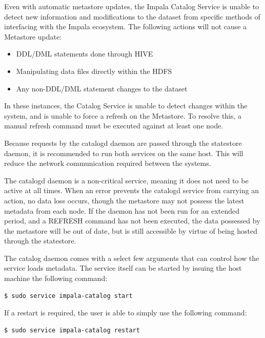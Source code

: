 \documentclass[onecolumn, draftclsnofoot,10pt, compsoc]{IEEEtran}
\begin{document}
Even with automatic metastore updates, the Impala Catalog Service is unable to detect new information and modifications to the dataset from specific methods of interfacing with the Impala ecosystem.
The following actions will not cause a Metastore update:

\begin{itemize}
    \item DDL/DML statements done through HIVE
    \item Manipulating data files directly within the HDFS
    \item Any non-DDL/DML statement changes to the dataset
\end{itemize}

In these instances, the Catalog Service is unable to detect changes within the system, and is unable to force a refresh on the Metastore. To resolve this, a manual refresh command must be executed against at least one node.

Because requests by the catalogd daemon are passed through the statestore daemon, it is recommended to run both services on the same host. This will reduce the network communication required between the systems.

The catalogd daemon is a non-critical service, meaning it does not need to be active at all times. When an error prevents the catalogd service from carrying an action, no data loss occurs, though the metastore may not possess the latest metadata from each node. If the daemon has not been run for an extended period, and a REFRESH command has not been executed, the data possessed by the metastore will be out of date, but is still accessible by virtue of being hosted through the statestore.

The catalog daemon comes with a select few arguments that can control how the service loads metadata.
The service itself can be started by issuing the host machine the following command:
    \begin{center}
    \begin{lstlisting}[language=bash]
$ sudo service impala-catalog start
    \end{lstlisting}
    \end{center}

If a restart is required, the user is able to simply use the following command:
    \begin{center}
        \begin{lstlisting}[language=bash]
$ sudo service impala-catalog restart
        \end{lstlisting}
    \end{center}
\end{document}
